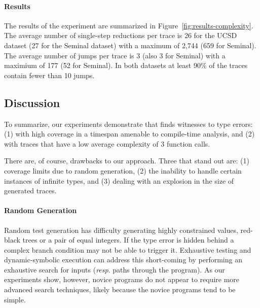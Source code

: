 \paragraph{Results}
\label{sec:results-complexity}
The results of the experiment are summarized in
Figure~\ref{fig:results-complexity}.
%
The average number of single-step reductions per trace is 26 for the
UCSD dataset (27 for the Seminal dataset) with a maximum of 2,744 (659
for Seminal). The average number of jumps per trace is 3 (also 3 for
Seminal) with a maximium of 177 (52 for Seminal). In both datasets at
least 90\% of the traces contain fewer than 10 jumps.
%

\subsection{Discussion}
\label{sec:discussion}
To summarize, our experiments demonstrate that \nanomaly finds witnesses
to type errors: (1) with high coverage in a timespan amenable to
compile-time analysis, and (2) with traces that have a low average
complexity of 3 function calls.

There are, of course, drawbacks to our approach. Three that stand out
are: (1) coverage limits due to random generation, (2) the inability to
handle certain instances of infinite types, and (3) dealing with an
explosion in the size of generated traces.

\paragraph{Random Generation}
Random test generation has difficulty generating highly constrained
values, \eg red-black trees or a pair of equal integers. If the type
error is hidden behind a complex branch condition \nanomaly may not be
able to trigger it. Exhaustive testing and dynamic-symbolic execution
can address this short-coming by performing an exhaustive search for
inputs (\emph{resp}. paths through the program). As our experiments
show, however, novice programs do not appear to require more advanced
search techniques, likely because the novice programs tend to be simple.

